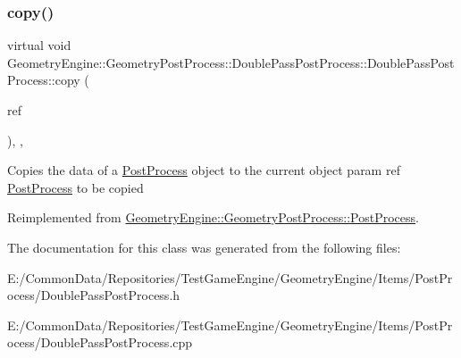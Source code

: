 \subsubsection{\texorpdfstring{copy()}{copy()}}
{\footnotesize\ttfamily virtual void Geometry\+Engine\+::\+Geometry\+Post\+Process\+::\+Double\+Pass\+Post\+Process\+::\+Double\+Pass\+Post\+Process\+::copy (\begin{DoxyParamCaption}\item[{const \mbox{\hyperlink{class_geometry_engine_1_1_geometry_post_process_1_1_post_process}{Post\+Process}} \&}]{ref }\end{DoxyParamCaption})\hspace{0.3cm}{\ttfamily [inline]}, {\ttfamily [protected]}, {\ttfamily [virtual]}}

Copies the data of a \mbox{\hyperlink{class_geometry_engine_1_1_geometry_post_process_1_1_post_process}{Post\+Process}} object to the current object param ref \mbox{\hyperlink{class_geometry_engine_1_1_geometry_post_process_1_1_post_process}{Post\+Process}} to be copied 

Reimplemented from \mbox{\hyperlink{class_geometry_engine_1_1_geometry_post_process_1_1_post_process_aba093c175b228894204e785a5a54e6e9}{Geometry\+Engine\+::\+Geometry\+Post\+Process\+::\+Post\+Process}}.



The documentation for this class was generated from the following files\+:\begin{DoxyCompactItemize}
\item 
E\+:/\+Common\+Data/\+Repositories/\+Test\+Game\+Engine/\+Geometry\+Engine/\+Items/\+Post\+Process/Double\+Pass\+Post\+Process.\+h\item 
E\+:/\+Common\+Data/\+Repositories/\+Test\+Game\+Engine/\+Geometry\+Engine/\+Items/\+Post\+Process/Double\+Pass\+Post\+Process.\+cpp\end{DoxyCompactItemize}
